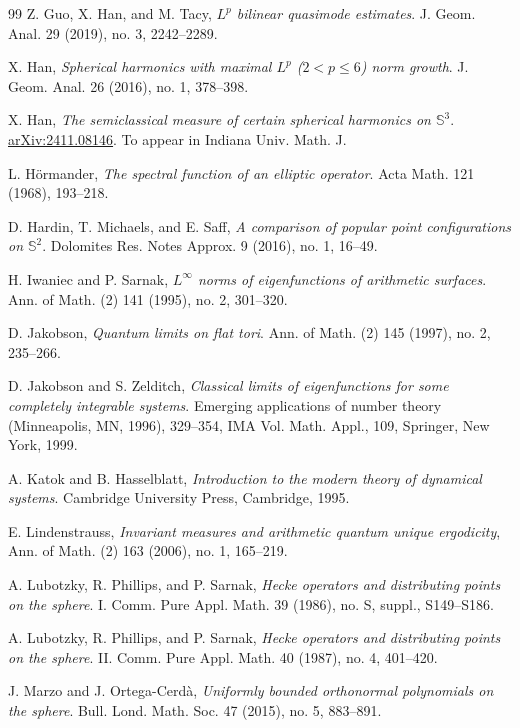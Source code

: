 \documentclass[12pt,reqno]{amsart}
\newcommand{\Sb}{\mathbb{S}}
\theoremstyle{plain}
\theoremstyle{definition}
\theoremstyle{remark}
\numberwithin{equation}{section}
\begin{document}
\begin{thebibliography}{99}
 Z. Guo, X. Han, and M. Tacy, 
\textit{$L^p$ bilinear quasimode estimates}. J. Geom. Anal. 29 (2019), no. 3, 2242--2289.

 X. Han, 
\textit{Spherical harmonics with maximal $L^p$ ($2<p\le6$) norm growth}. J. Geom. Anal. 26 (2016), no. 1, 378--398. 

 X. Han, 
\textit{The semiclassical measure of certain spherical harmonics on $\Sb^3$}. \href{https://arxiv.org/abs/2411.08146}{arXiv:2411.08146}. To appear in Indiana Univ. Math. J.

 L. H\"ormander, 
\textit{The spectral function of an elliptic operator}. Acta Math. 121 (1968), 193--218.

 D. Hardin, T. Michaels, and E. Saff, 
\textit{A comparison of popular point configurations on $\Sb^2$}. Dolomites Res. Notes Approx. 9 (2016), no. 1, 16--49. 

 H. Iwaniec and P. Sarnak,
\textit{$L^\infty$ norms of eigenfunctions of arithmetic surfaces}. Ann. of Math. (2) 141 (1995), no. 2, 301--320.

 D. Jakobson, 
\textit{Quantum limits on flat tori}. Ann. of Math. (2) 145 (1997), no. 2, 235--266.

 D. Jakobson and S. Zelditch, 
\textit{Classical limits of eigenfunctions for some completely integrable systems}. Emerging applications of number theory (Minneapolis, MN, 1996), 329--354, IMA Vol. Math. Appl., 109, Springer, New York, 1999.

 A. Katok and B. Hasselblatt,
\textit{Introduction to the modern theory of dynamical systems}. Cambridge University Press, Cambridge, 1995.

 E. Lindenstrauss, 
\textit{Invariant measures and arithmetic quantum unique ergodicity}, Ann. of Math. (2) 163 (2006), no. 1, 165--219.

 A. Lubotzky, R. Phillips, and P. Sarnak,
\textit{Hecke operators and distributing points on the sphere}. I. Comm. Pure Appl. Math. 39 (1986), no. S, suppl., S149--S186.

 A. Lubotzky, R. Phillips, and P. Sarnak,
\textit{Hecke operators and distributing points on the sphere}. II. Comm. Pure Appl. Math. 40 (1987), no. 4, 401--420.

 J. Marzo and J. Ortega-Cerd\`a, 
\textit{Uniformly bounded orthonormal polynomials on the sphere}. Bull. Lond. Math. Soc. 47 (2015), no. 5, 883--891. 


\end{thebibliography}
\end{document}
